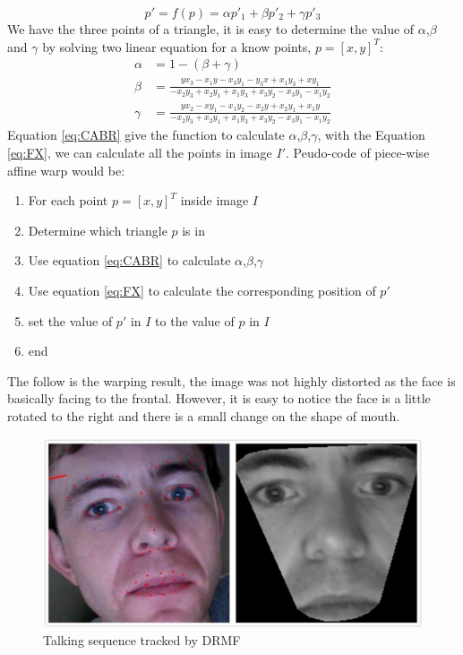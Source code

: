 \begin{equation}
p' = f(p) = \alpha p'_{1} + \beta p'_{2} + \gamma p'_{3}
\label{eq:FX}
\end{equation}
We have the three points of a triangle, it is easy to determine the value of $\alpha$,$\beta$ and $\gamma$ by solving two linear equation for a know points, $p = [x,y]^{T}$:
\begin{equation}
\label{eq:CABR}
\begin{split}
\alpha & = 1 - (\beta + \gamma) \\
\beta  & = \frac{yx_{3}-x_{1}y-x_{3}y_{1}-y_{3}x+x_{1}y_{3}+xy_{1}}{-x_{2}y_{3}+x_{2}y_{1}+x_{1}y_{3}+x_{3}y_{2}-x_{3}y_{1}-x_{1}y_{2}} \\
\gamma & = \frac{yx_{2}-xy_{1}-x_{1}y_{2}-x_{2}y+x_{2}y_{1}+x_{1}y}{-x_{2}y_{3}+x_{2}y_{1}+x_{1}y_{3}+x_{3}y_{2}-x_{3}y_{1}-x_{1}y_{2}}
\end{split}
\end{equation}
\newline
Equation \ref{eq:CABR} give the function to calculate $\alpha$,$\beta$,$\gamma$, with the Equation \ref{eq:FX}, we can calculate all the points in image $I'$. Peudo-code of piece-wise affine warp would be:
\begin{enumerate}
\item For each point $p = [x,y]^{T}$ inside image $I$
\item Determine which triangle $p$ is in
\item Use equation \ref{eq:CABR} to calculate $\alpha$,$\beta$,$\gamma$
\item Use equation \ref{eq:FX} to calculate the corresponding position of $p'$
\item set the value of $p'$ in $I$ to the value of $p$ in $I$
\item end
\end{enumerate}
The follow is the warping result, the image was not highly distorted as the face is basically facing to the frontal. However, it is easy to notice the face is a little rotated to the right and there is a small change on the shape of mouth.
\begin{figure}[ht]
\centering
\includegraphics[width=.5\textwidth]{imgs/Warping_Intraface_213.png}
\caption{Talking sequence tracked by DRMF}
\end{figure}
